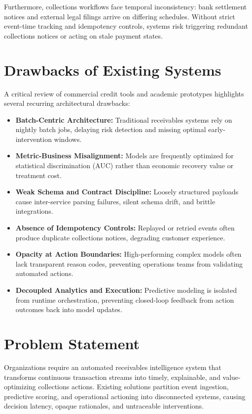 \documentclass[a4paper, 12pt]{report}
\begin{document}
Furthermore, collections workflows face temporal inconsistency: bank settlement notices and external legal filings arrive on differing schedules. Without strict event-time tracking and idempotency controls, systems risk triggering redundant collections notices or acting on stale payment states.

\section{Drawbacks of Existing Systems}
A critical review of commercial credit tools and academic prototypes highlights several recurring architectural drawbacks:
\begin{itemize}[itemsep=2pt]
    \item \textbf{Batch-Centric Architecture:} Traditional receivables systems rely on nightly batch jobs, delaying risk detection and missing optimal early-intervention windows.
    \item \textbf{Metric-Business Misalignment:} Models are frequently optimized for statistical discrimination (AUC) rather than economic recovery value or treatment cost.
    \item \textbf{Weak Schema and Contract Discipline:} Loosely structured payloads cause inter-service parsing failures, silent schema drift, and brittle integrations.
    \item \textbf{Absence of Idempotency Controls:} Replayed or retried events often produce duplicate collections notices, degrading customer experience.
    \item \textbf{Opacity at Action Boundaries:} High-performing complex models often lack transparent reason codes, preventing operations teams from validating automated actions.
    \item \textbf{Decoupled Analytics and Execution:} Predictive modeling is isolated from runtime orchestration, preventing closed-loop feedback from action outcomes back into model updates.
\end{itemize}

\section{Problem Statement}
Organizations require an automated receivables intelligence system that transforms continuous transaction streams into timely, explainable, and value-optimizing collections actions. Existing solutions partition event ingestion, predictive scoring, and operational actioning into disconnected systems, causing decision latency, opaque rationales, and untraceable interventions.
\end{document}
